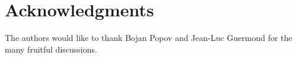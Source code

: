 \documentclass[preprint,10pt]{elsarticle}
\begin{document}
\section*{Acknowledgments} 
The authors would like to thank Bojan Popov and Jean-Luc Guermond for the many fruitful discussions.  

\newpage
\appendix
\end{document}
